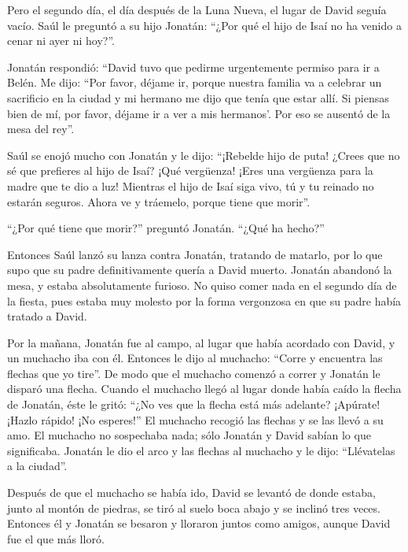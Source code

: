  Pero el segundo día, el día después de la Luna Nueva, el
lugar de David seguía vacío. Saúl le preguntó a su hijo Jonatán: ``¿Por
qué el hijo de Isaí no ha venido a cenar ni ayer ni hoy?''.

 Jonatán respondió: ``David tuvo que pedirme urgentemente
permiso para ir a Belén.  Me dijo: ``Por favor, déjame ir,
porque nuestra familia va a celebrar un sacrificio en la ciudad y mi
hermano me dijo que tenía que estar allí. Si piensas bien de mí, por
favor, déjame ir a ver a mis hermanos'. Por eso se ausentó de la mesa
del rey''.

 Saúl se enojó mucho con Jonatán y le dijo: ``¡Rebelde hijo
de puta! ¿Crees que no sé que prefieres al hijo de Isaí? ¡Qué vergüenza!
¡Eres una vergüenza para la madre que te dio a luz! 
Mientras el hijo de Isaí siga vivo, tú y tu reinado no estarán seguros.
Ahora ve y tráemelo, porque tiene que morir''.

 ``¿Por qué tiene que morir?'' preguntó Jonatán. ``¿Qué ha
hecho?''

 Entonces Saúl lanzó su lanza contra Jonatán, tratando de
matarlo, por lo que supo que su padre definitivamente quería a David
muerto.  Jonatán abandonó la mesa, y estaba absolutamente
furioso. No quiso comer nada en el segundo día de la fiesta, pues estaba
muy molesto por la forma vergonzosa en que su padre había tratado a
David.

 Por la mañana, Jonatán fue al campo, al lugar que había
acordado con David, y un muchacho iba con él.  Entonces le
dijo al muchacho: ``Corre y encuentra las flechas que yo tire''. De modo
que el muchacho comenzó a correr y Jonatán le disparó una flecha.
 Cuando el muchacho llegó al lugar donde había caído la
flecha de Jonatán, éste le gritó: ``¿No ves que la flecha está más
adelante?  ¡Apúrate! ¡Hazlo rápido! ¡No esperes!'' El
muchacho recogió las flechas y se las llevó a su amo.  El
muchacho no sospechaba nada; sólo Jonatán y David sabían lo que
significaba.  Jonatán le dio el arco y las flechas al
muchacho y le dijo: ``Llévatelas a la ciudad''.

 Después de que el muchacho se había ido, David se levantó
de donde estaba, junto al montón de piedras, se tiró al suelo boca abajo
y se inclinó tres veces. Entonces él y Jonatán se besaron y lloraron
juntos como amigos, aunque David fue el que más lloró.

